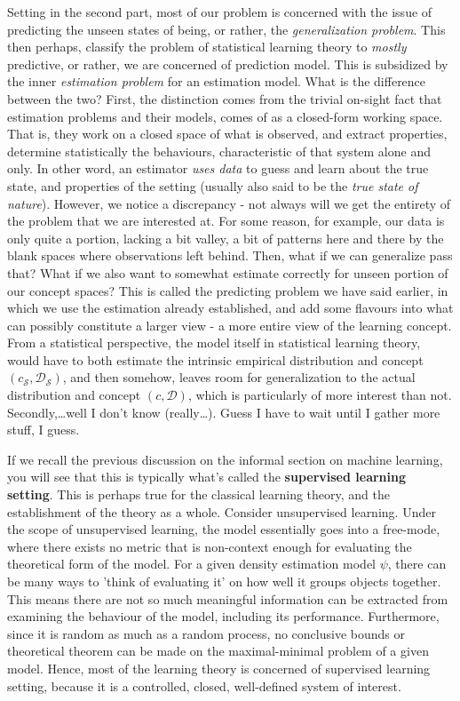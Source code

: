 Setting in the second part, most of our problem is concerned with the issue of predicting the unseen states of being, or rather, the \textit{generalization problem}. This then perhaps, classify the problem of statistical learning theory to \textit{mostly} predictive, or rather, we are concerned of prediction model. This is subsidized by the inner \textit{estimation problem} for an estimation model. What is the difference between the two? First, the distinction comes from the trivial on-sight fact that estimation problems and their models, comes of as a closed-form working space. That is, they work on a closed space of what is observed, and extract properties, determine statistically the behaviours, characteristic of that system alone and only. In other word, an estimator \textit{uses data} to guess and learn about the true state, and properties of the setting (usually also said to be the \textit{true state of nature}). However, we notice a discrepancy - not always will we get the entirety of the problem that we are interested at. For some reason, for example, our data is only quite a portion, lacking a bit valley, a bit of patterns here and there by the blank spaces where observations left behind. Then, what if we can generalize pass that? What if we also want to somewhat estimate correctly for unseen portion of our concept spaces? This is called the predicting problem we have said earlier, in which we use the estimation already established, and add some flavours into what can possibly constitute a larger view - a more entire view of the learning concept. From a statistical perspective, the model itself in statistical learning theory, would have to both estimate the intrinsic empirical distribution and concept $(c_{\mathcal{S}},\mathcal{D}_{\mathcal{S}})$, and then somehow, leaves room for generalization to the actual distribution and concept $(c,\mathcal{D})$, which is particularly of more interest than not. Secondly,\dots well I don't know (really\dots). Guess I have to wait until I gather more stuff, I guess. 

If we recall the previous discussion on the informal section on machine learning, you will see that this is typically what's called the \textbf{supervised learning setting}. This is perhaps true for the classical learning theory, and the establishment of the theory as a whole. Consider unsupervised learning. Under the scope of unsupervised learning, the model essentially goes into a free-mode, where there exists no metric that is non-context enough for evaluating the theoretical form of the model. For a given density estimation model $\psi$, there can be many ways to 'think of evaluating it' on how well it groups objects together. This means there are not so much meaningful information can be extracted from examining the behaviour of the model, including its performance. Furthermore, since it is random as much as a random process, no conclusive bounds or theoretical theorem can be made on the maximal-minimal problem of a given model. Hence, most of the learning theory is concerned of supervised learning setting, because it is a controlled, closed, well-defined system of interest. 

